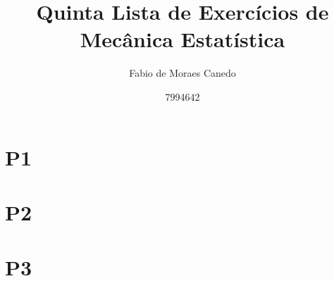 \documentclass[a4paper,12pt]{article}
\title{Quinta Lista de Exercícios de Mecânica Estatística}
\author{Fabio de Moraes Canedo \and
7994642}
\begin{document}
\maketitle

%

%

\section{P1}



\section{P2}



\section{P3}




% 
%
%
\end{document}
